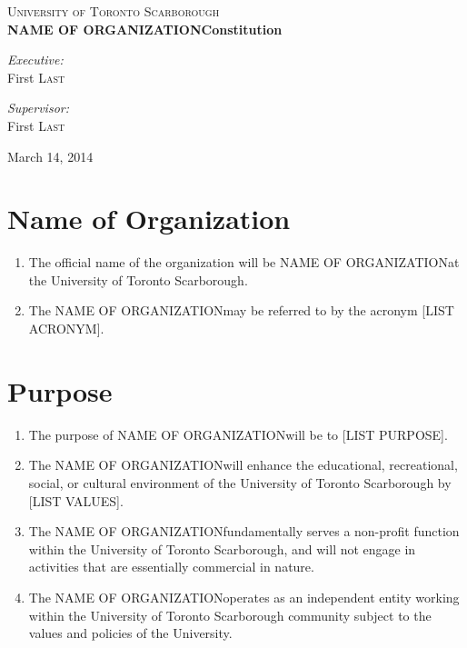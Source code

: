 \documentclass[12pt]{article}
\newcommand{\orgname}{NAME OF ORGANIZATION\space}
\begin{document}

\begin{titlepage}
\begin{center}

\textsc{\LARGE University of Toronto Scarborough}\\[3.0cm]

{ \huge \bfseries \orgname Constitution\\[1.0cm] }

\begin{minipage}{0.4\textwidth}
\begin{flushleft} \large
\emph{Executive:}\\
First \textsc{Last}
\end{flushleft}
\end{minipage}
\begin{minipage}{0.4\textwidth}
\begin{flushright} \large
\emph{Supervisor:} \\
First \textsc{Last}
\end{flushright}
\end{minipage}
\vfill

{March 14, 2014}
\end{center}
\end{titlepage}




\section{Name of Organization}
\begin{enumerate}[{1}.1]
    \item The official name of the organization will be \orgname at the University of Toronto Scarborough.
    \item The \orgname may be referred to by the acronym [LIST ACRONYM].
\end{enumerate}

\section{Purpose}
\begin{enumerate}[{2}.1]
    \item	The purpose of \orgname will be to [LIST PURPOSE].
    \item	The \orgname will enhance the educational, recreational, social, or cultural environment of the University of Toronto Scarborough by [LIST VALUES].
    \item	The \orgname fundamentally serves a non-profit function within the University of Toronto Scarborough, and will not engage in activities that are essentially commercial in nature. 
    \item	The \orgname operates as an independent entity working within the University of Toronto Scarborough community subject to the values and policies of the University.  
\end{enumerate}
\end{document}
